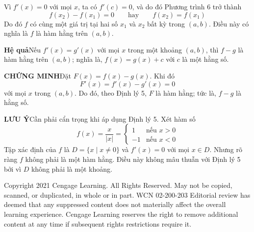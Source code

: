 \begin{minipage}[t]{0.71\textwidth}
  \vspace{-2pt}
  \noindent
  
  \vspace{1pt}
  Vì $f'(x) = 0$ với mọi $x$, ta có $f'(c) = 0$, và do đó Phương trình 6 trở thành
  \[
    f(x_2) - f(x_1) = 0 \qquad \text{hay} \qquad f(x_2) = f(x_1)
  \]
  Do đó $f$ có cùng một giá trị tại hai số $x_1$ và $x_2$ bất kỳ trong $(a, b)$. Điều này có nghĩa là $f$ là hàm hằng trên $(a, b)$. \hfill {\color{stewartred}\blacksquare}

  \vspace{4pt}
  \begin{stewarttheorembox}
    \hspace{0.6em}\textbf{\textsf{\color{stewartred}Hệ quả}}\hspace{0.8em}Nếu $f'(x) = g'(x)$ với mọi $x$ trong một khoảng $(a, b)$, thì $f - g$ là hàm hằng trên $(a, b)$; nghĩa là, $f(x) = g(x) + c$ với $c$ là một hằng số.
  \end{stewarttheorembox}

  \vspace{3pt}
  \textbf{\textsf{\color{stewartred}CHỨNG MINH}}\quad Đặt $F(x) = f(x) - g(x)$. Khi đó
  \[
    F'(x) = f'(x) - g'(x) = 0
  \]
  với mọi $x$ trong $(a, b)$. Do đó, theo Định lý 5, $F$ là hàm hằng; tức là, $f - g$ là hằng số. \hfill {\color{stewartred}\blacksquare}

  \vspace{4pt}
  \textbf{\textsf{\color{stewartgreen}LƯU Ý}}\quad Cần phải cẩn trọng khi áp dụng Định lý 5. Xét hàm số
  \[
    f(x) = \frac{x}{|x|} =
    \begin{cases}
      1  & \text{nếu } x > 0 \\
      -1 & \text{nếu } x < 0
    \end{cases}
  \]
  Tập xác định của $f$ là $D = \{x \mid x \neq 0\}$ và $f'(x) = 0$ với mọi $x \in D$. Nhưng rõ ràng $f$ không phải là một hàm hằng. Điều này không mâu thuẫn với Định lý 5 bởi vì $D$ không phải là một khoảng.
\end{minipage}

\vfill
\noindent
\parbox{\textwidth}{%
  \fontsize{6.8}{8}\selectfont\color{stewartgray}
  Copyright 2021 Cengage Learning. All Rights Reserved. May not be copied, scanned, or duplicated, in whole or in part. WCN 02-200-203\newline
  Editorial review has deemed that any suppressed content does not materially affect the overall learning experience. Cengage Learning reserves the right to remove additional content at any time if subsequent rights restrictions require it.
}
